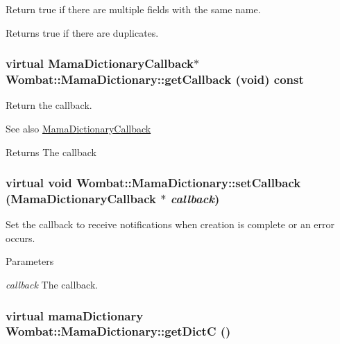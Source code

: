 Return true if there are multiple fields with the same name. \begin{DoxyReturn}{Returns}
true if there are duplicates. 
\end{DoxyReturn}
\hypertarget{classWombat_1_1MamaDictionary_a5083693551dcd12ac87f4f7fb635f53c}{
\subsubsection[{getCallback}]{\setlength{\rightskip}{0pt plus 5cm}virtual {\bf MamaDictionaryCallback}$\ast$ Wombat::MamaDictionary::getCallback (void) const}}
\label{classWombat_1_1MamaDictionary_a5083693551dcd12ac87f4f7fb635f53c}


Return the callback. \begin{DoxySeeAlso}{See also}
\hyperlink{classWombat_1_1MamaDictionaryCallback}{MamaDictionaryCallback} 
\end{DoxySeeAlso}
\begin{DoxyReturn}{Returns}
The callback 
\end{DoxyReturn}
\hypertarget{classWombat_1_1MamaDictionary_aa40c49fc374c99b872bc7654d57a6253}{
\subsubsection[{setCallback}]{\setlength{\rightskip}{0pt plus 5cm}virtual void Wombat::MamaDictionary::setCallback ({\bf MamaDictionaryCallback} $\ast$ {\em callback})}}
\label{classWombat_1_1MamaDictionary_aa40c49fc374c99b872bc7654d57a6253}


Set the callback to receive notifications when creation is complete or an error occurs. 
\begin{DoxyParams}{Parameters}
\item[{\em callback}]The callback. \end{DoxyParams}
\hypertarget{classWombat_1_1MamaDictionary_aafbd6c9faf6110a56832056153896792}{
\subsubsection[{getDictC}]{\setlength{\rightskip}{0pt plus 5cm}virtual mamaDictionary Wombat::MamaDictionary::getDictC ()}}
\label{classWombat_1_1MamaDictionary_aafbd6c9faf6110a56832056153896792}


